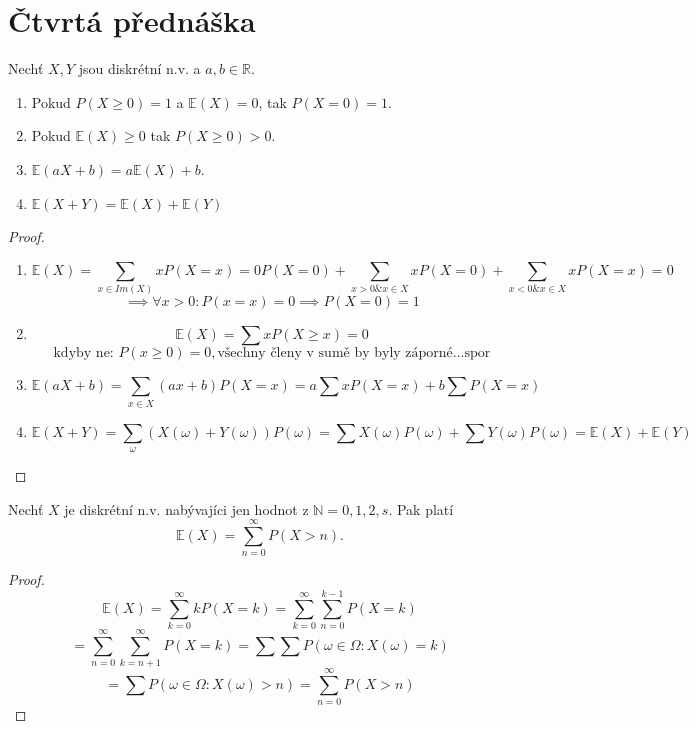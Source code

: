 \documentclass[../main.tex]{subfiles}
\begin{document}
\section{Čtvrtá přednáška}

\begin{theorem}
    Nechť $X,Y$ jsou diskrétní n.v. a $a,b \in \mathbb{R}$.
    \begin{enumerate}
        \item Pokud $P(X\geq 0) = 1$ a $\mathbb{E}(X) = 0$, tak $P(X=0)=1$.
        \item Pokud $\mathbb{E}(X) \geq 0$ tak $P(X\geq 0) > 0.$
        \item $\mathbb{E}(a X + b) = a \mathbb{E}(X) + b$.
        \item $\mathbb{E}(X+Y) = \mathbb{E}(X) + \mathbb{E}(Y)$
    \end{enumerate}
\end{theorem}
\begin{proof}
\begin{enumerate}
    \item
    \[\mathbb{E}(X) = \sum_{x \in Im(X)} x  P(X = x) = 0  P(X = 0) + \sum_{x > 0 \& x \in X} x  P(X = 0) + 
    \sum_{x < 0 \& x \in X} x P(X=x) = 0\]
    \[\implies \forall x > 0 : P(x = x) = 0 \implies P(X = 0) = 1\]
    \item
    \[\mathbb{E}(X) = \sum x P(X\geq x) = 0\]
    \[\text{kdyby ne: } P(x\geq 0) = 0, \text{všechny členy v sumě by byly záporné...spor}\]
    \item
    \[\mathbb{E}(a X+b) = \sum_{x\in X} (a x + b)P(X=x) = a\sum xP(X=x) + b\sum P(X=x)\]
    \item
    \[\mathbb{E}(X+Y) = \sum_{\omega}(X(\omega)+Y(\omega))P({\omega}) = \sum X(\omega)P({\omega})
    + \sum Y(\omega)P({\omega}) = \mathbb{E}(X) + \mathbb{E}(Y)\]
\end{enumerate}
\end{proof}

\begin{theorem}
    Nechť $X$ je diskrétní n.v. nabývajíci jen hodnot z $\mathbb{N} = {0,1,2,s}$. Pak platí
    \[\mathbb{E}(X) = \sum^\infty_{n = 0} P(X>n).\]
\end{theorem}
\begin{proof}
    \[\mathbb{E}(X) = \sum^\infty_{k=0} kP(X=k) = \sum^\infty_{k=0} \sum^{k-1}_{n=0} P(X=k)\]
    \[= \sum_{n=0}^\infty \sum_{k=n+1}^\infty P(X=k) = \sum \sum P({\omega \in \Omega : X(\omega) = k})\]
    \[= \sum P({\omega \in \Omega : X(\omega) > n}) = \sum^\infty_{n=0} P(X>n)\]
\end{proof}
\end{document}
